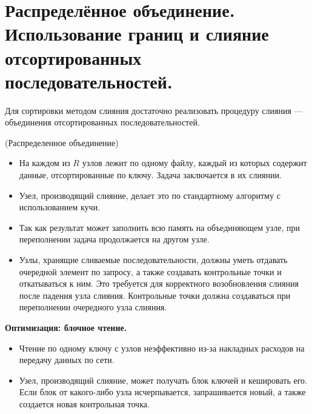 \section{Распределённое объединение. Использование границ и слияние
  отсортированных последовательностей.}

Для сортировки методом слияния достаточно реализовать процедуру слияния ---
объединения отсортированных последовательностей.

\begin{algorithm}(Распределенное объединение)
  \begin{itemize}
    \item На каждом из $R$ узлов лежит по одному файлу, каждый из которых
      содержит данные, отсортированные по ключу. Задача заключается в их
      слиянии.
    \item Узел, производящий слияние, делает это по стандартному алгоритму с
      использованием кучи.
    \item Так как результат может заполнить всю память на объединяющем узле,
      при переполнении задача продолжается на другом узле.
    \item Узлы, хранящие сливаемые последовательности, должны уметь отдавать
      очередной элемент по запросу, а также создавать контрольные точки и
      откатываться к ним. Это требуется для корректного возобновления слияния
      после падения узла слияния. Контрольные точки должна создаваться при
      переполнении очередного узла слияния.
  \end{itemize}
\end{algorithm}

\textbf{Оптимизация: блочное чтение.}
\begin{itemize}
  \item Чтение по одному ключу с узлов неэффективно из-за накладных расходов на
    передачу данных по сети.
  \item Узел, производящий слияние, может получать блок ключей и кешировать его.
    Если блок от какого-либо узла исчерпывается, запрашивается новый, а также
    создается новая контрольная точка.
\end{itemize}


